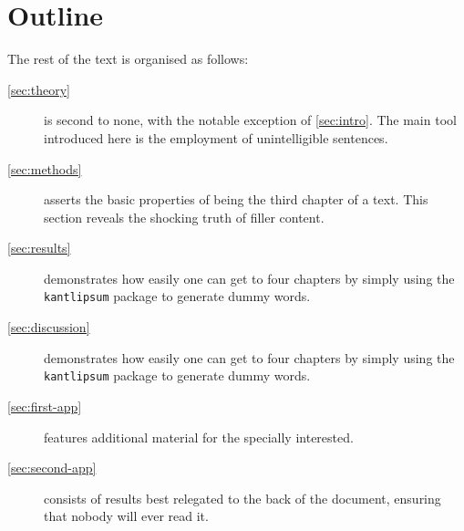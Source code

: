\section{Outline}

The rest of the text is organised as follows:
\begin{description}
    \item[\cref{sec:theory}]
    is second to none, with the notable exception of \cref{sec:intro}.
    The main tool introduced here is the employment of unintelligible sentences.

    \item[\cref{sec:methods}]
    asserts the basic properties of being the third chapter of a text.
    This section reveals the shocking truth of filler content.

    \item[\cref{sec:results}]
    demonstrates how easily one can get to four chapters by simply using the \texttt{kantlipsum} package to generate dummy words.
    
    \item[\cref{sec:discussion}]
    demonstrates how easily one can get to four chapters by simply using the \texttt{kantlipsum} package to generate dummy words.

    \item[\cref{sec:first-app}]
    features additional material for the specially interested.

    \item[\cref{sec:second-app}]
    consists of results best relegated to the back of the document,
    ensuring that nobody will ever read it.
\end{description}